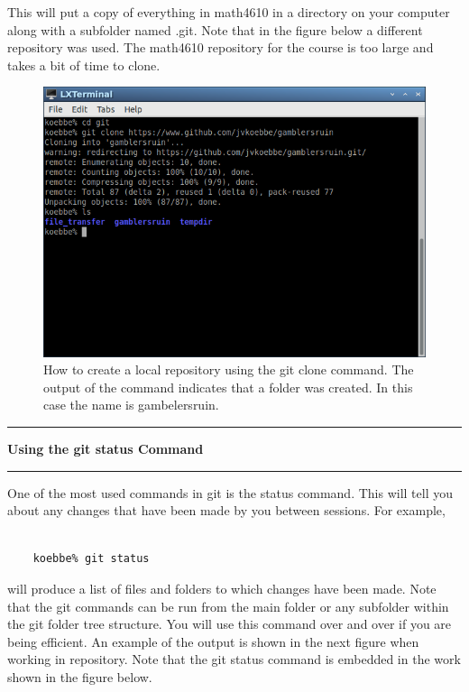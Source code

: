 \documentclass[10pt,fleqn]{article}
\begin{document}
This will put a copy of everything in math4610 in a directory on your computer
along with a subfolder named .git. Note that in the figure below a different
repository was used. The math4610 repository for the course is too large and
takes a bit of time to clone.
\vfill
\begin{figure}[h]
\centering
\includegraphics[width=5.0in]{../images/git_05.png}
\vskip0.1in
\caption{How to create a local repository using the git clone command. The
output of the command indicates that a folder was created. In this case the
name is gambelersruin.}
\end{figure}
\eject
\vskip0.1in\hrule\vskip0.1in\noindent
{\bf Using the git status Command} 
\vskip0.1in\hrule\vskip0.1in\noindent
One of the most used commands in git is the status command. This will tell you
about any changes that have been made by you between sessions. For example,
\begin{verbatim}

    koebbe% git status

\end{verbatim}
will produce a list of files and folders to which changes have been made. Note
that the git commands can be run from the main folder or any subfolder within
the git folder tree structure. You will use this command over and over if you
are being efficient. An example of the output is shown in the next figure when
working in repository. Note that the git status command is embedded in the work
shown in the figure below.
\vfill
\end{document}
